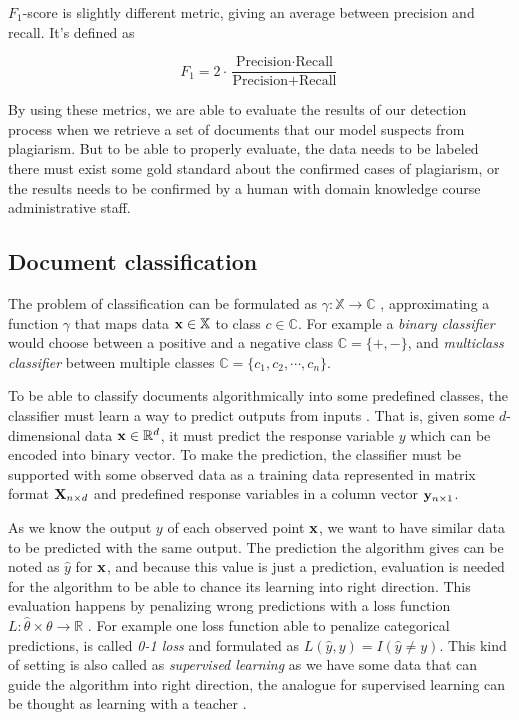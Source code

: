 $F_1$-score is slightly different metric, giving an average between precision and recall. It's defined as

\begin{equation}
    F_1 = 2 \cdot \dfrac{\text{Precision} \cdot \text{Recall}}{\text{Precision} + \text{Recall}}
\end{equation}

By using these metrics, we are able to evaluate the results of our detection process when we retrieve a set of documents that our model suspects from plagiarism. But to be able to properly evaluate, the data needs to be labeled \ie there must exist some gold standard about the confirmed cases of plagiarism, or the results needs to be confirmed by a human with domain knowledge \eg course administrative staff. 

\subsection{Document classification} \label{chap-bg-classification}

The problem of classification can be formulated as $\gamma: \mathbb{X} \rightarrow \mathbb{C}$ \cite{Manning:2008:IIR:1394399}, approximating a function $\gamma$ that maps data $\mathbf{x} \in \mathbb{X}$ to class $c \in \mathbb{C}$. For example a \emph{binary classifier} would choose between a positive and a negative class $\mathbb{C} = \{+, -\}$, and \emph{multiclass classifier} between multiple classes $\mathbb{C} = \{c_1, c_2, \cdots, c_n\}$.

To be able to classify documents algorithmically into some predefined classes, the classifier must learn a way to predict outputs from inputs \cite{hastie_09_elements-of.statistical-learning}. That is, given some $d$-dimensional data $\mathbf{x} \in \mathbb{R}^d$, it must predict the response variable $y$ which can be encoded into binary vector. To make the prediction, the classifier must be supported with some observed data as a training data represented in matrix format $\mathbf{X}_{n \times d}$ and predefined response variables in a column vector $\mathbf{y}_{n \times 1}$. 

As we know the output $y$ of each observed point $\mathbf{x}$, we want to have similar data to be predicted with the same output. The prediction the algorithm gives can be noted as $\hat{y}$ for $\mathbf{x}$, and because this value is just a prediction, evaluation is needed for the algorithm to be able to chance its learning into right direction. This evaluation happens by penalizing wrong predictions with a loss function $L: \hat{\theta} \times \theta \rightarrow \mathbb{R}$ \cite{hastie_09_elements-of.statistical-learning}. For example one loss function able to penalize categorical predictions, is called \emph{0-1 loss} and formulated as $L(\hat{y}, y) = I(\hat{y} \neq y)$. This kind of setting is also called as \emph{supervised learning} as we have some data that can guide the algorithm into right direction, the analogue for supervised learning can be thought as learning with a teacher \cite{hastie_09_elements-of.statistical-learning}.



